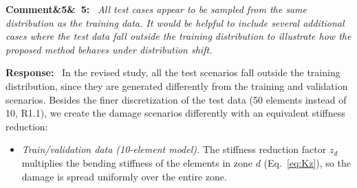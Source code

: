 \documentclass[11pt]{article}
\newenvironment{rcomment}[1]{\par\bigskip\noindent\textbf{Comment\ifx&#1&\else\ #1\fi:}\ \itshape}{\par}
\newenvironment{response}{\par\smallskip\noindent\color{resp}\textbf{Response:}\ }{\par}
\begin{document}
\begin{rcomment}{5}
All test cases appear to be sampled from the same distribution as the training data. It would be helpful to include several additional cases where the test data fall outside the training distribution to illustrate how the proposed method behaves under distribution shift.
\end{rcomment}

\begin{response}
In the revised study, all the test scenarios fall outside the training distribution, since they are generated
differently from the training and validation scenarios. Besides the finer discretization of the test data (50 elements
instead of 10, R1.1), we create the damage scenarios differently with an equivalent stiffness reduction:
\begin{itemize}[leftmargin=*]
\item \emph{Train/validation data (10-element model).} The stiffness reduction factor $z_d$ multiplies the bending stiffness of the elements in zone $d$ (Eq.~\eqref{eq:Kz}), so the damage is spread uniformly over the entire zone. 


\end{itemize}
\end{response}
\end{document}
